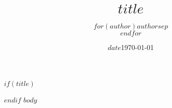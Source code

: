 \documentclass[11pt]{article}
\title{$title$}
\author{$for(author)$$author$$sep$ \\ $endfor$}
\date{$date$}
\date{\today}
\begin{document}
$if(title)$
\maketitle
$endif$
$body$
\end{document}
